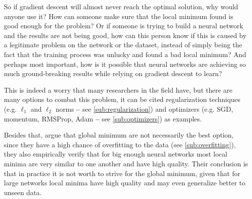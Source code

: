 So if gradient descent will almost never reach the optimal solution, why would anyone use it? How can someone make sure that the local minimum found is good enough for the problem? Or if someone is trying to build a neural network and the results are not being good, how can this person know if this is caused by a legitimate problem on the network or the dataset, instead of simply being the fact that the training process was unlucky and found a bad local minimum? And perhaps most important, how is it possible that neural networks are achieving so much ground-breaking results while relying on gradient descent to learn?

This is indeed a worry that many researchers in the field have, but there are many options to combat this problem, it can be cited regularization techniques (e.g. $\ell_1$ and $\ell_2$ norms \textbf{--} see \autoref{sub:regularization}) and optimizers (e.g. \gls{SGD}, momentum, RMSProp, \gls{Adam} \textbf{--} see \autoref{sub:optimizers}) as examples. 

Besides that, \textcite{lossSurfaces2014} argue that global minimum are not necessarily the best option, since they have a high chance of overfitting to the data (see \autoref{sub:overfitting}), they also empirically verify that for big enough neural networks most local minima are very similar to one another and have high quality. Their conclusion is that in practice it is not worth to strive for the global minimum, given that for large networks local minima have high quality and may even generalize better to unseen data.
